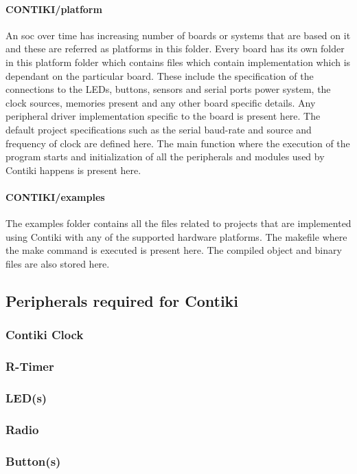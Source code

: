 \paragraph{CONTIKI/platform} An \gls{soc} over time has increasing number of boards or systems that are based on it and these are referred as platforms in this folder. Every board has its own folder in this platform folder which contains files which contain implementation which is dependant on the particular board. These include the specification of the connections to the LEDs, buttons, sensors and serial ports power system, the clock sources, memories present and any other board specific details. Any peripheral driver implementation specific to the board is present here. The default project specifications such as the serial baud-rate and source and frequency of clock are defined here. The main function where the execution of the program starts and initialization of all the peripherals and modules used by Contiki happens is present here.

\paragraph{CONTIKI/examples} The examples folder contains all the files related to projects that are implemented using Contiki with any of the supported hardware platforms. The makefile where the make command is executed is present here. The compiled object and binary files are also stored here.

\subsection{Peripherals required for Contiki}\label{peripheralsContiki}
\subsubsection{Contiki Clock}
\subsubsection{R-Timer}
\subsubsection{LED(s)}
\subsubsection{Radio}
\subsubsection{Button(s)}
